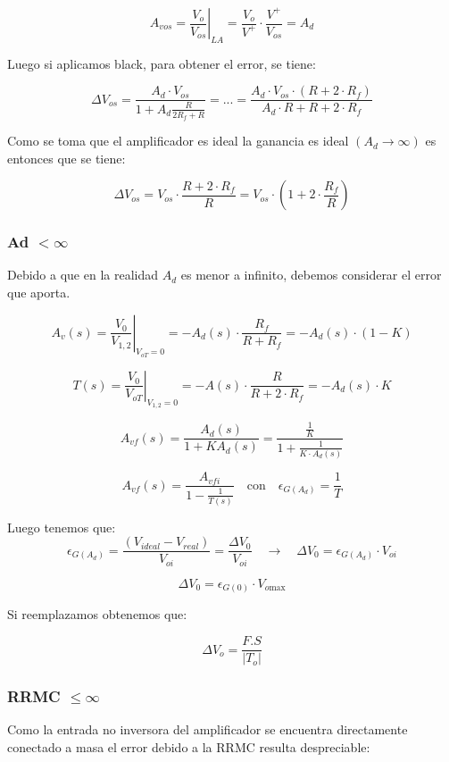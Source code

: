 \[
A_{vos} = \left.\frac{V_{o}}{V_{o s}}\right|_{LA} = 
\frac{V_{o}}{V^{+}} \cdot \frac{V^{+}}{V_{os}} = A_d
\]

Luego si aplicamos black, para obtener el error, se tiene:
 
\[
\Delta V_{os} = \frac{A_d \cdot V_{os}}{1+A_d \frac{R}{2 R_f+R}} = ... 
 = \frac{A_d \cdot V_{os} \cdot (R + 2 \cdot R_f)}{A_d \cdot R + R + 2 \cdot R_f}
\]
 

Como se toma que el amplificador es ideal la ganancia es ideal $\left(A_{d} \rightarrow \infty\right)$ es entonces que se tiene:

\[
\Delta V_{os}  = V_{os} \cdot \frac {R + 2 \cdot R_f}{R} 
=  V_{os} \cdot (1 + 2 \cdot \frac {R_f}{R} )
\]
 
\subsubsection{Ad $ <  \infty $}

Debido a que en la realidad $A_d$ es menor a infinito, debemos considerar el error que aporta.

\[ A_v(s) = \left.\frac{V_0}{V_{1,2}}\right|_{V_{oT} = 0}  = -A_d(s) \cdot \frac{R_f}{R + R_f} = -A_d(s) \cdot (1 - K) \]

\[ T(s) = \left.\frac{V_0}{V_{oT}}\right|_{V_{1,2} = 0} = -A(s) \cdot  \frac{R}{R + 2\cdot R_f}= - A_d(s) \cdot K \]

\[ A_{vf}(s) = \frac{A_d(s)}{1 + K A_d(s)} = \frac{ \frac{1}{K} }{1+\frac{1}{K\cdot A_d(s)}}  \]

\[A_{vf}(s) = \frac{A_{vfi}}{1 - \frac{1}{T(s)}}  \quad  \text{con}  \quad  \epsilon_{G(A_d)} = \frac{1}{T} \]


Luego tenemos que:
\[
\epsilon_{G(A_d)} = \frac{(V_{ideal} - V_{real})}{V_{oi}} = \frac{\Delta V_0}{V_{oi}} \quad \rightarrow \quad \Delta V_0 = \epsilon_{G(A_d)} \cdot V_{oi}  
\]



\[
\Delta V_0 = \epsilon_{G(0)} \cdot V_{o\text{max}} 
\]

Si reemplazamos obtenemos que:

$$
\Delta V_{o}=\frac{F.S}{\left|T_{o}\right|}
$$


\subsubsection{RRMC $\le \infty$}

Como la entrada no inversora del amplificador se encuentra directamente conectado a masa el error debido a la RRMC resulta despreciable:

